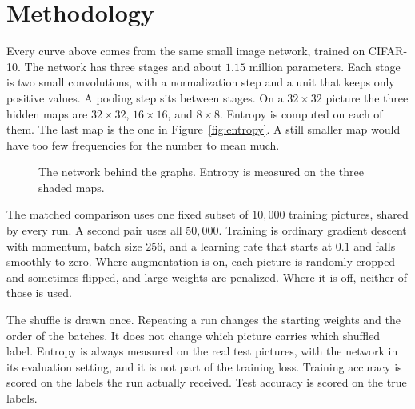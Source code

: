 \documentclass[11pt,a4paper]{article}
\begin{document}
\section{Methodology}

Every curve above comes from the same small image network, trained on CIFAR-10. The network has three stages and about \(1.15\) million parameters. Each stage is two small convolutions, with a normalization step and a unit that keeps only positive values. A pooling step sits between stages. On a \(32\times 32\) picture the three hidden maps are \(32\times 32\), \(16\times 16\), and \(8\times 8\). Entropy is computed on each of them. The last map is the one in Figure~\ref{fig:entropy}. A still smaller map would have too few frequencies for the number to mean much.

\begin{figure}[H]
\centering
{}
\caption{The network behind the graphs. Entropy is measured on the three shaded maps.}
\label{fig:net}
\end{figure}

The matched comparison uses one fixed subset of \(10{,}000\) training pictures, shared by every run. A second pair uses all \(50{,}000\). Training is ordinary gradient descent with momentum, batch size \(256\), and a learning rate that starts at \(0.1\) and falls smoothly to zero. Where augmentation is on, each picture is randomly cropped and sometimes flipped, and large weights are penalized. Where it is off, neither of those is used.

The shuffle is drawn once. Repeating a run changes the starting weights and the order of the batches. It does not change which picture carries which shuffled label. Entropy is always measured on the real test pictures, with the network in its evaluation setting, and it is not part of the training loss. Training accuracy is scored on the labels the run actually received. Test accuracy is scored on the true labels.
\end{document}
